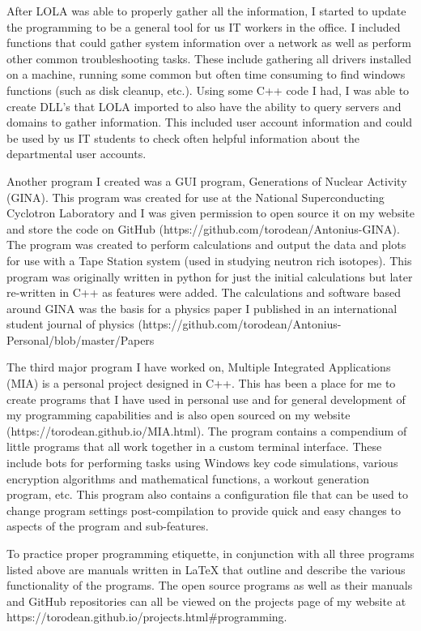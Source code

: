 \documentclass[11pt,a4paper,sans]{moderncv} %
\begin{document}
\hspace{1cm}After LOLA was able to properly gather all the information, I started to update the programming to be a general tool for us IT workers in the office. I included functions that could gather system information over a network as well as perform other common troubleshooting tasks. These include gathering all drivers installed on a machine, running some common but often time consuming to find windows functions (such as disk cleanup, etc.). Using some C++ code I had, I was able to create DLL’s that LOLA imported to also have the ability to query servers and domains to gather information. This included user account information and could be used by us IT students to check often helpful information about the departmental user accounts.

\hspace{1cm}Another program I created was a GUI program, Generations of Nuclear Activity (GINA). This program was created for use at the National Superconducting Cyclotron Laboratory and I was given permission to open source it on my website and store the code on GitHub (https://github.com/torodean/Antonius-GINA). The program was created to perform calculations and output the data and plots for use with a Tape Station system (used in studying neutron rich isotopes). This program was originally written in python for just the initial calculations but later re-written in C++ as features were added. The calculations and software based around GINA was the basis for a physics paper I published in an international student journal of physics (https://github.com/torodean/Antonius-Personal/blob/master/Papers%

\hspace{1cm}The third major program I have worked on, Multiple Integrated Applications (MIA) is a personal project designed in C++. This has been a place for me to create programs that I have used in personal use and for general development of my programming capabilities and is also open sourced on my website (https://torodean.github.io/MIA.html). The program contains a compendium of little programs that all work together in a custom terminal interface. These include bots for performing tasks using Windows key code simulations, various encryption algorithms and mathematical functions, a workout generation program, etc. This program also contains a configuration file that can be used to change program settings post-compilation to provide quick and easy changes to aspects of the program and sub-features. 

\hspace{1cm}To practice proper programming etiquette, in conjunction with all three programs listed above are manuals written in LaTeX that outline and describe the various functionality of the programs. The open source programs as well as their manuals and GitHub repositories can all be viewed on the projects page of my website at https://torodean.github.io/projects.html\#programming.


\makeletterclosing %

\end{document}
